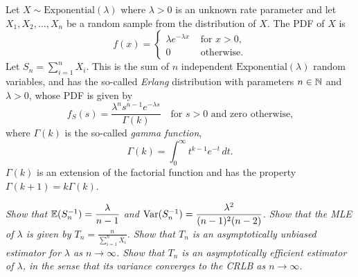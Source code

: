 \begin{exercise}
\begin{questions}
\question 
Let $X\sim\text{Exponential}(\lambda)$ where $\lambda>0$ is an unknown rate parameter and let $X_1,X_2,\ldots,X_n$ be a random sample from the distribution of $X$. The PDF of $X$ is
\[
f(x) = \begin{cases}
	\lambda e^{-\lambda x}	& \text{ for $x>0$,} \\
	0						& \text{ otherwise.}
\end{cases}
\]
Let $S_n=\sum_{i=1}^n X_i$. This is the sum of $n$ independent $\text{Exponential}(\lambda)$ random variables, and has the so-called \emph{Erlang} distribution with parameters $n\in\mathbb{N}$ and $\lambda>0$, whose PDF is given by
\[
f_S(s) = \frac{\lambda^n s^{n-1}e^{-\lambda s}}{\Gamma(k)} \quad\text{for $s>0$ and zero otherwise,} 
\]
where $\Gamma(k)$ is the so-called \emph{gamma function},
\[
\Gamma(k) = \int_{0}^{\infty} t^{k-1}e^{-t}\,dt.
\]
$\Gamma(k)$ is an extension of the factorial function and has the property $\Gamma(k+1) = k\Gamma(k)$.

\ben
\it Show that 
$\mathbb{E}(S_n^{-1}) = \displaystyle\frac{\lambda}{n-1}$ and 
$\text{Var}(S_n^{-1}) = \displaystyle\frac{\lambda^2}{(n-1)^2(n-2)}$.
\it Show that the MLE of $\lambda$ is given by $T_n = \displaystyle\frac{n}{\sum_{i=1}^n X_i}$.
\it Show that $T_n$ is an asymptotically unbiased estimator for $\lambda$ as $n\to\infty$.
\it Show that $T_n$ is an asymptotically efficient estimator of $\lambda$, in the sense that its variance converges to the CRLB as $n\to\infty$.
\een


\end{questions}
\end{exercise}
